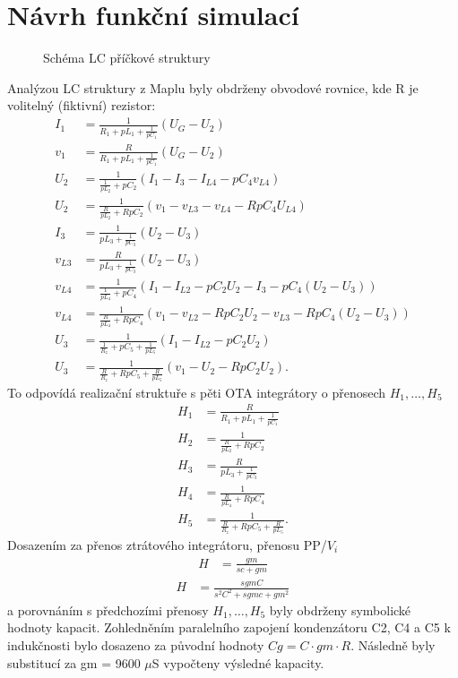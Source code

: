 \documentclass[twoside]{article}
\begin{document}
\section{Návrh funkční simulací}
\begin{figure}[H]
\centering
{}
\caption{Schéma LC příčkové struktury}
\end{figure}
\noindent Analýzou LC struktury z Maplu byly obdrženy obvodové rovnice, kde R je volitelný (fiktivní) rezistor:
\begin{align}
I_1 &= \frac{1}{R_1 + pL_1 + \frac{1}{pC_1}}(U_G - U_2)\\
v_1 & = \frac{R}{R_1 + pL_1 + \frac{1}{pC_1}}(U_G - U_2)\\
U_2 &= \frac{1}{\frac{1}{pL_2} + pC_2}(I_1 - I_{3} - I_{L4} - pC_4 v_{L4})\\
U_2 &= \frac{1}{\frac{R}{pL_2} + RpC_2}(v_1 - v_{L3} - v_{L4} - RpC_4 U_{L4})\\
I_{3} &= \frac{1}{pL_3 + \frac{1}{pC_3}}(U_2 - U_3)\\
v_{L3} &= \frac{R}{pL_3 + \frac{1}{pC_3}}(U_2 - U_3)\\
v_{L4} &= \frac{1}{\frac{1}{pL_4}+pC_4}(I_1 - I_{L2} - pC_2U_2 - I_{3} - pC_4 (U_2 - U_3))\\
v_{L4} &= \frac{1}{\frac{R}{pL_4}+RpC_4}(v_1 - v_{L2} - RpC_2U_2 - v_{L3} - RpC_4 (U_2 - U_3))\\
U_3 &= \frac{1}{\frac{1}{R_z}+pC_5 + \frac{1}{pL_5}}(I_1 - I_{L2} - pC_2U_2)\\
U_3 &= \frac{1}{\frac{R}{R_z}+RpC_5 + \frac{R}{pL_5}}(v_1 - U_2 - RpC_2 U_2).
\end{align}
\noindent To odpovídá realizační struktuře s pěti OTA integrátory o přenosech $H_1, \ldots,H_5$
\begin{align}
H_1 & = \frac{R}{R_1 + pL_1 + \frac{1}{pC_1}}\\
H_2 &= \frac{1}{\frac{R}{pL_2} + RpC_2}\\
H_3 &= \frac{R}{pL_3 + \frac{1}{pC_3}}\\
H_4 &= \frac{1}{\frac{R}{pL_4}+RpC_4}\\
H_5 &= \frac{1}{\frac{R}{R_z}+RpC_5 + \frac{R}{pL_5}}.
\end{align}
\noindent Dosazením za přenos ztrátového integrátoru, přenosu PP/$V_i$
\begin{align}
H & = \frac{gm}{sc + gm}
\end{align}
\begin{align}
H & = \frac{s gm C}{s^2 C^2+ s gm c + gm^2}
\end{align}
a porovnáním s předchozími přenosy $H_1,  \ldots, H_5$ byly obdrženy symbolické hodnoty kapacit.
\noindent Zohledněním paralelního zapojení kondenzátoru C2, C4 a C5 k indukčnosti bylo dosazeno za původní hodnoty $Cg=C \cdot gm \cdot R$.
\noindent Následně byly substitucí za gm = 9600 $\mu$S vypočteny výsledné kapacity.
\end{document}

